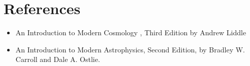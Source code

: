 \section{References}
\begin{itemize}
    \item An Introduction to Modern Cosmology 
    , Third Edition by Andrew Liddle
    \item An Introduction to Modern Astrophysics, Second Edition, by Bradley W. Carroll and Dale A. Ostlie.
\end{itemize}


